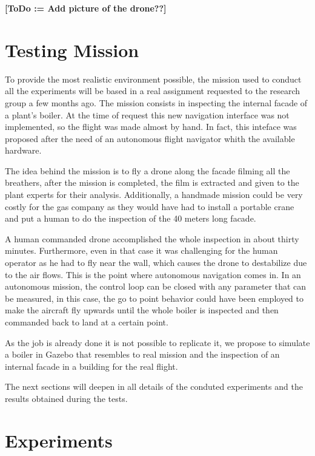   \textbf{[ToDo := Add picture of the drone??]}

\section{Testing Mission} \label{ch_5:sect:testing_mission}

  To provide the most realistic environment possible, the mission used to conduct all the experiments will be based in a real assignment requested to the research group a few months ago. The mission consists in inspecting the internal facade of a plant's boiler. At the time of request this new navigation interface was not implemented, so the flight was made almost by hand. In fact, this inteface was proposed after the need of an autonomous flight navigator whith the available hardware.

  The idea behind the mission is to fly a drone along the facade filming all the breathers, after the mission is completed, the film is extracted and given to the plant experts for their analysis. Additionally, a handmade mission could be very costly for the gas company as they would have had to install a portable crane and put a human to do the inspection of the 40 meters long facade.

  A human commanded drone accomplished the whole inspection in about thirty minutes. Furthermore, even in that case it was challenging for the human operator as he had to fly near the wall, which causes the drone to destabilize due to the air flows. This is the point where autonomous navigation comes in. In an autonomous mission, the control loop can be closed with any parameter that can be measured, in this case, the go to point behavior could have been employed to make the aircraft fly upwards until the whole boiler is inspected and then commanded back to land at a certain point.

  As the job is already done it is not possible to replicate it, we propose to simulate a boiler in Gazebo that resembles to real mission and the inspection of an internal facade in a building for the real flight.

  The next sections will deepen in all details of the conduted experiments and the results obtained during the tests.

\section{Experiments} \label{ch_5:sect:experiments}

